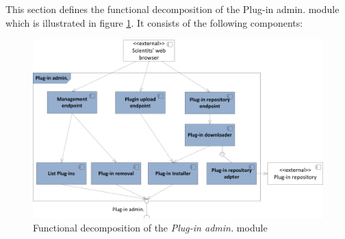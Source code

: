 This section defines the functional decomposition of the Plug-in admin. module which is illustrated in figure \ref{fig_admin_func}. It consists of the following components:

\begin{figure}[h!]
  \centering
  	\includegraphics[scale=0.75]{plug-in/layers/admin-func.png}
  \caption{Functional decomposition of the \textit{Plug-in admin.} module}
  \label{fig_admin_func}
\end{figure}

